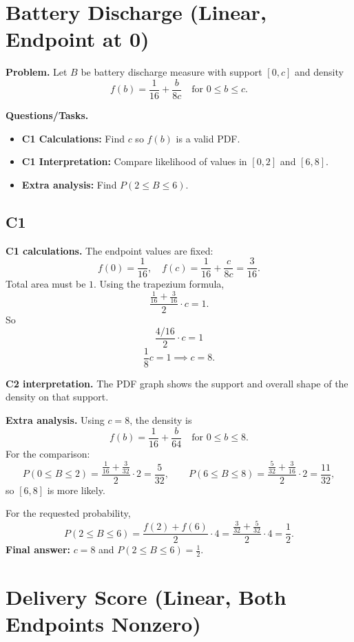 \section{Battery Discharge (Linear, Endpoint at 0)}

\textbf{Problem.}
Let $B$ be battery discharge measure with support $[0,c]$ and density
\[
f(b)=\frac{1}{16}+\frac{b}{8c}\quad\text{for }0\le b\le c.
\]

\textbf{Questions/Tasks.}
\begin{itemize}
	\item \textbf{C1 Calculations:} Find $c$ so $f(b)$ is a valid PDF.
	\item \textbf{C1 Interpretation:} Compare likelihood of values in $[0,2]$ and $[6,8]$.
	\item \textbf{Extra analysis:} Find $P(2\le B\le 6)$.
\end{itemize}

\subsection*{C1}

\textbf{C1 calculations.}
The endpoint values are fixed:
\[
f(0)=\frac{1}{16},\quad f(c)=\frac{1}{16}+\frac{c}{8c}=\frac{3}{16}.
\]
Total area must be $1$. Using the trapezium formula,
\[
\frac{\frac{1}{16}+\frac{3}{16}}{2}\cdot c=1.
\]
So
\[
\frac{4/16}{2}\cdot c=1
\]
	\[
	\frac{1}{8}c=1\implies c=8.
	\]

\textbf{C2 interpretation.}
The PDF graph shows the support and overall shape of the density on that support.

\textbf{Extra analysis.}
Using $c=8$, the density is
\[
f(b)=\frac{1}{16}+\frac{b}{64}\quad\text{for }0\le b\le 8.
\]
For the comparison:
\[
P(0\le B\le2)=\frac{\frac{1}{16}+\frac{3}{32}}{2}\cdot2=\frac{5}{32},\qquad
P(6\le B\le8)=\frac{\frac{5}{32}+\frac{3}{16}}{2}\cdot2=\frac{11}{32},
\]
so $[6,8]$ is more likely.

For the requested probability,
\[
P(2\le B\le6)=\frac{f(2)+f(6)}{2}\cdot4
=\frac{\frac{3}{32}+\frac{5}{32}}{2}\cdot4
=\frac12.
\]
\textbf{Final answer:} $c=8$ and $P(2\le B\le6)=\frac12$.

	\section{Delivery Score (Linear, Both Endpoints Nonzero)}
	
